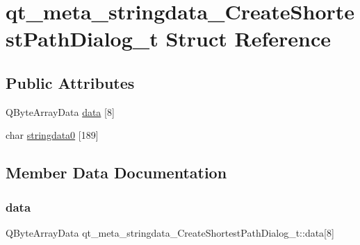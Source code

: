 \hypertarget{structqt__meta__stringdata___create_shortest_path_dialog__t}{}\section{qt\+\_\+meta\+\_\+stringdata\+\_\+\+Create\+Shortest\+Path\+Dialog\+\_\+t Struct Reference}
\label{structqt__meta__stringdata___create_shortest_path_dialog__t}
\subsection*{Public Attributes}
\begin{DoxyCompactItemize}
\item 
Q\+Byte\+Array\+Data \mbox{\hyperlink{structqt__meta__stringdata___create_shortest_path_dialog__t_a137a1cc7303bdb3b14a79174154d34b5}{data}} \mbox{[}8\mbox{]}
\item 
char \mbox{\hyperlink{structqt__meta__stringdata___create_shortest_path_dialog__t_ad1ab8564faa767cd1fe9e7a990290905}{stringdata0}} \mbox{[}189\mbox{]}
\end{DoxyCompactItemize}


\subsection{Member Data Documentation}
\mbox{\label{structqt__meta__stringdata___create_shortest_path_dialog__t_a137a1cc7303bdb3b14a79174154d34b5}} 
\subsubsection{\texorpdfstring{data}{data}}
{\footnotesize\ttfamily Q\+Byte\+Array\+Data qt\+\_\+meta\+\_\+stringdata\+\_\+\+Create\+Shortest\+Path\+Dialog\+\_\+t\+::data\mbox{[}8\mbox{]}}

\mbox{\label{structqt__meta__stringdata___create_shortest_path_dialog__t_ad1ab8564faa767cd1fe9e7a990290905}} 
